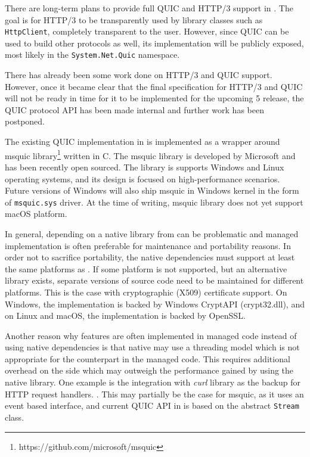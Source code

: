 There are long-term plans to provide full QUIC and HTTP/3 support in \dotnet{}. The goal is for
HTTP/3 to be transparently used by library classes such as \texttt{HttpClient}, completely
transparent to the user. However, since QUIC can be used to build other protocols as well, its
implementation will be publicly exposed, most likely in the \texttt{System.Net.Quic} namespace.

There has already been some work done on HTTP/3 and QUIC support. However, once it became clear that
the final specification for HTTP/3 and QUIC will not be ready in time for it to be implemented for
the upcoming \dotnet{} 5 release, the QUIC protocol API has been made internal and further work has
been postponed.

The existing QUIC implementation in \dotnet{} is implemented as a wrapper around msquic
library\footnote{https://github.com/microsoft/msquic} written in C. The msquic library is developed
by Microsoft and has been recently open sourced. The library is supports Windows and Linux operating
systems, and its design is focused on high-performance scenarios. Future versions of Windows will
also ship msquic in Windows kernel in the form of \texttt{msquic.sys} driver. At the time of
writing, msquic library does not yet support macOS platform.

In general, depending on a native library from \dotnet{} can be problematic and managed
implementation is often preferable for maintenance and portability reasons. In order not to
sacrifice portability, the native dependencies must support at least the same platforms as
\dotnet{}. If some platform is not supported, but an alternative library exists, separate versions
of \dotnet{} source code need to be maintained for different platforms. This is the case with
cryptographic (X509) certificate support. On Windows, the implementation is backed by Windows
CryptAPI (crypt32.dll), and on Linux and macOS, the implementation is backed by OpenSSL\@.

Another reason why features are often implemented in managed code instead of using native
dependencies is that native may use a threading model which is not appropriate for the counterpart
in the managed \dotnet{} code. This requires additional overhead on the \dotnet{} side which may
outweigh the performance gained by using the native library. One example is the integration with
\textit{curl} library as the backup for HTTP request handlers. . This may partially be the case for msquic, as it uses an event based interface, and current
QUIC API in \dotnet{} is based on the abstract \texttt{Stream} class.

